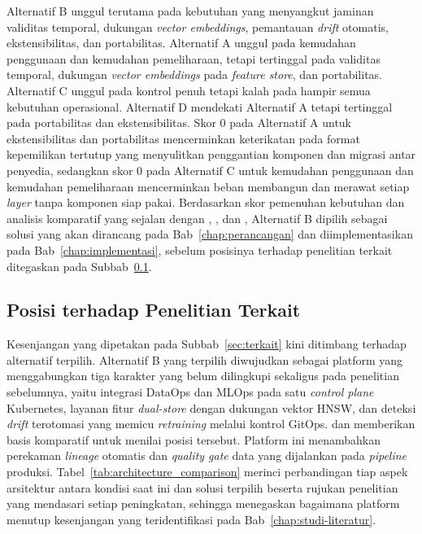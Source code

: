 





Alternatif B unggul terutama pada kebutuhan yang menyangkut jaminan validitas temporal, dukungan \textit{vector embeddings}, pemantauan \textit{drift} otomatis, ekstensibilitas, dan portabilitas. Alternatif A unggul pada kemudahan penggunaan dan kemudahan pemeliharaan, tetapi tertinggal pada validitas temporal, dukungan \textit{vector embeddings} pada \textit{feature store}, dan portabilitas. Alternatif C unggul pada kontrol penuh tetapi kalah pada hampir semua kebutuhan operasional. Alternatif D mendekati Alternatif A tetapi tertinggal pada portabilitas dan ekstensibilitas. Skor 0 pada Alternatif A untuk ekstensibilitas dan portabilitas mencerminkan keterikatan pada format kepemilikan tertutup yang menyulitkan penggantian komponen dan migrasi antar penyedia, sedangkan skor 0 pada Alternatif C untuk kemudahan penggunaan dan kemudahan pemeliharaan mencerminkan beban membangun dan merawat setiap \textit{layer} tanpa komponen siap pakai. Berdasarkan skor pemenuhan kebutuhan dan analisis komparatif yang sejalan dengan \textcite{burgueno2025toward}, \textcite{najafabadi2024analysis}, dan \textcite{lakka2025kubernetes}, Alternatif B dipilih sebagai solusi yang akan dirancang pada Bab~\ref{chap:perancangan} dan diimplementasikan pada Bab~\ref{chap:implementasi}, sebelum posisinya terhadap penelitian terkait ditegaskan pada Subbab~\ref{subsec:posisi-penelitian}.

\subsection{Posisi terhadap Penelitian Terkait}
\label{subsec:posisi-penelitian}

Kesenjangan yang dipetakan pada Subbab~\ref{sec:terkait} kini ditimbang terhadap alternatif terpilih. Alternatif B yang terpilih diwujudkan sebagai platform yang menggabungkan tiga karakter yang belum dilingkupi sekaligus pada penelitian sebelumnya, yaitu integrasi DataOps dan MLOps pada satu \textit{control plane} Kubernetes, layanan fitur \textit{dual-store} dengan dukungan vektor HNSW, dan deteksi \textit{drift} terotomasi yang memicu \textit{retraining} melalui kontrol GitOps. \textcite{hsu2024endtoend} dan \textcite{liang2024automating} memberikan basis komparatif untuk menilai posisi tersebut. Platform ini menambahkan perekaman \textit{lineage} otomatis dan \textit{quality gate} data yang dijalankan pada \textit{pipeline} produksi. Tabel~\ref{tab:architecture_comparison} merinci perbandingan tiap aspek arsitektur antara kondisi saat ini dan solusi terpilih beserta rujukan penelitian yang mendasari setiap peningkatan, sehingga menegaskan bagaimana platform menutup kesenjangan yang teridentifikasi pada Bab~\ref{chap:studi-literatur}.

